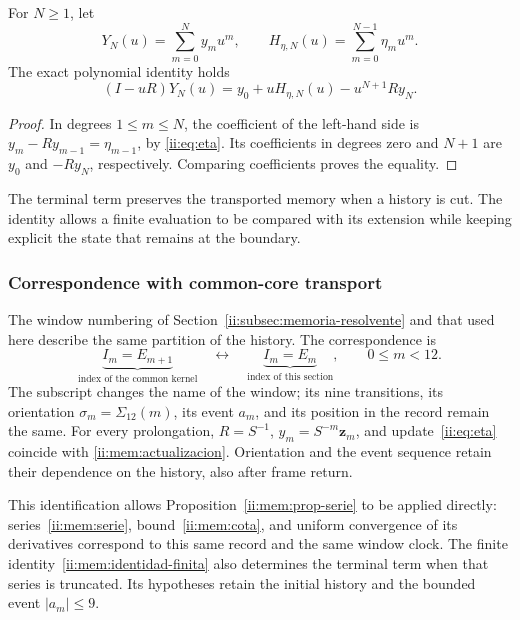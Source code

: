 \begin{proposition}
For $N\geq1$, let
\[
Y_N(u)=\sum_{m=0}^N y_mu^m,\qquad
H_{\eta,N}(u)=\sum_{m=0}^{N-1}\eta_mu^m.
\]
The exact polynomial identity holds
\begin{equation}
(I-uR)Y_N(u)=y_0+uH_{\eta,N}(u)-u^{N+1}Ry_N.
\label{ii:mem:identidad-finita}
\end{equation}
\end{proposition}
\begin{proof}
In degrees $1\leq m\leq N$, the coefficient of the left-hand side is $y_m-Ry_{m-1}=\eta_{m-1}$, by \eqref{ii:eq:eta}. Its coefficients in degrees zero and $N+1$ are $y_0$ and $-Ry_N$, respectively. Comparing coefficients proves the equality.
\end{proof}

The terminal term preserves the transported memory when a history is cut. The identity allows a finite evaluation to be compared with its extension while keeping explicit the state that remains at the boundary.

\subsubsection{Correspondence with common-core transport}

The window numbering of Section~\ref{ii:subsec:memoria-resolvente}
and that used here describe the same partition of the history. The
correspondence is
\[
 \underbrace{I_m=E_{m+1}}_{\text{index of the common kernel}}
 \quad\longleftrightarrow\quad
 \underbrace{I_m=E_m}_{\text{index of this section}},
 \qquad 0\leq m<12.
\]
The subscript changes the name of the window; its nine transitions,
its orientation \(\sigma_m=\Sigma_{12}(m)\), its event \(a_m\), and
its position in the record remain the same. For every prolongation,
\(R=S^{-1}\), \(y_m=S^{-m}\mathbf z_m\), and
update~\eqref{ii:eq:eta} coincide with
\eqref{ii:mem:actualizacion}. Orientation and the event sequence
retain their dependence on the history, also after
frame return.

This identification allows Proposition~\ref{ii:mem:prop-serie}
to be applied directly: series~\eqref{ii:mem:serie},
bound~\eqref{ii:mem:cota}, and uniform convergence of its derivatives
correspond to this same record and the same window clock. The
finite identity~\eqref{ii:mem:identidad-finita} also determines the terminal
term when that series is truncated. Its hypotheses retain the initial history
and the bounded event \(|a_m|\leq9\).

